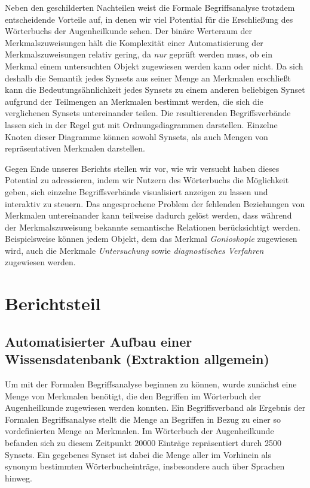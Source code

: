 \documentclass[pagesize,DIV=calc,12pt,draft]{scrreprt}
\begin{document}
Neben den geschilderten Nachteilen weist die Formale Begriffsanalyse trotzdem entscheidende Vorteile auf, in denen wir viel Potential für die Erschließung des Wörterbuchs der Augenheilkunde sehen. 
Der binäre Werteraum der Merkmalszuweisungen hält die Komplexität einer Automatisierung der Merkmalszuweisungen relativ gering, da \emph{nur} geprüft werden muss, ob ein Merkmal einem untersuchten Objekt zugewiesen werden kann oder nicht. 
Da sich deshalb die Semantik jedes Synsets aus seiner Menge an Merkmalen erschließt kann die Bedeutungsähnlichkeit jedes Synsets zu einem anderen beliebigen Synset aufgrund der Teilmengen an Merkmalen bestimmt werden, die sich die verglichenen Synsets untereinander teilen. 
Die resultierenden Begriffsverbände lassen sich in der Regel gut mit Ordnungsdiagrammen darstellen.
Einzelne Knoten dieser Diagramme können sowohl Synsets, als auch Mengen von repräsentativen Merkmalen darstellen. 

Gegen Ende unseres Berichts stellen wir vor, wie wir versucht haben dieses Potential zu adressieren, indem wir Nutzern des Wörterbuchs die Möglichkeit geben, sich einzelne Begriffsverbände visualisiert anzeigen zu lassen und interaktiv zu steuern. 
Das angesprochene Problem der fehlenden Beziehungen von Merkmalen untereinander kann teilweise dadurch gelöst werden, dass während der Merkmalszuweisung bekannte semantische Relationen berücksichtigt werden. 
Beispielsweise können jedem Objekt, dem das Merkmal \emph{Gonioskopie} zugewiesen wird, auch die Merkmale \emph{Untersuchung} sowie \emph{diagnostisches Verfahren} zugewiesen werden. 

\chapter{Berichtsteil}

\section{Automatisierter Aufbau einer Wissensdatenbank (Extraktion allgemein)}

Um mit der Formalen Begriffsanalyse beginnen zu können, wurde zunächst eine Menge von Merkmalen benötigt, die den Begriffen im Wörterbuch der Augenheilkunde zugewiesen werden konnten. 
Ein Begriffsverband als Ergebnis der Formalen Begriffsanalyse stellt die Menge an Begriffen in Bezug zu einer so vordefinierten Menge an Merkmalen. 
Im Wörterbuch der Augenheilkunde befanden sich zu diesem Zeitpunkt 20000 Einträge repräsentiert durch 2500 Synsets. 
Ein gegebenes Synset ist dabei die Menge aller im Vorhinein als synonym bestimmten Wörterbucheinträge, insbesondere auch über Sprachen hinweg. 
\end{document}
